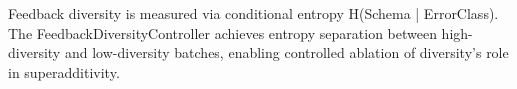 
Feedback diversity is measured via conditional entropy H(Schema | ErrorClass). The FeedbackDiversityController achieves entropy separation between high-diversity and low-diversity batches, enabling controlled ablation of diversity's role in superadditivity.


